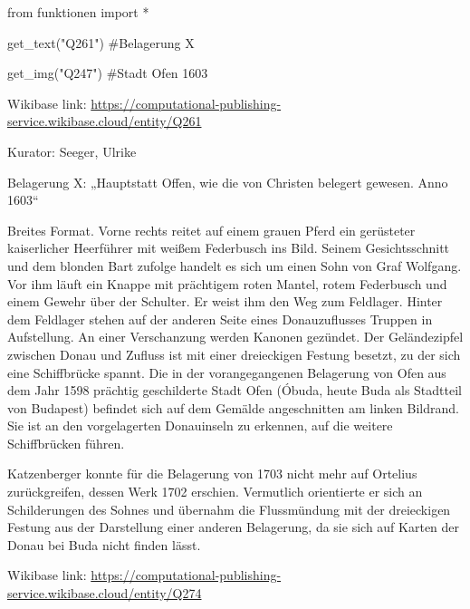 \documentclass[
  a4paper,
  portrait]{book}
\newenvironment{Shaded}{\begin{snugshade}}{\end{snugshade}}
\newcommand{\CommentTok}[1]{\textcolor[rgb]{0.37,0.37,0.37}{#1}}
\newcommand{\ImportTok}[1]{\textcolor[rgb]{0.00,0.46,0.62}{#1}}
\newcommand{\NormalTok}[1]{\textcolor[rgb]{0.00,0.23,0.31}{#1}}
\newcommand{\OperatorTok}[1]{\textcolor[rgb]{0.37,0.37,0.37}{#1}}
\newcommand{\StringTok}[1]{\textcolor[rgb]{0.13,0.47,0.30}{#1}}
\begin{document}
\begin{Shaded}
\begin{Highlighting}[]
\ImportTok{from}\NormalTok{ funktionen }\ImportTok{import} \OperatorTok{*}
\end{Highlighting}
\end{Shaded}

\begin{Shaded}
\begin{Highlighting}[]
\NormalTok{get\_text(}\StringTok{"Q261"}\NormalTok{)}
\CommentTok{\#Belagerung X}

\NormalTok{get\_img(}\StringTok{"Q247"}\NormalTok{)}
\CommentTok{\#Stadt Ofen 1603}
\end{Highlighting}
\end{Shaded}

Wikibase link:
\url{https://computational-publishing-service.wikibase.cloud/entity/Q261}

Kurator: Seeger, Ulrike

Belagerung X: „Hauptstatt Offen, wie die von Christen belegert gewesen.
Anno 1603``

Breites Format. Vorne rechts reitet auf einem grauen Pferd ein
gerüsteter kaiserlicher Heerführer mit weißem Federbusch ins Bild.
Seinem Gesichtsschnitt und dem blonden Bart zufolge handelt es sich um
einen Sohn von Graf Wolfgang. Vor ihm läuft ein Knappe mit prächtigem
roten Mantel, rotem Federbusch und einem Gewehr über der Schulter. Er
weist ihm den Weg zum Feldlager. Hinter dem Feldlager stehen auf der
anderen Seite eines Donauzuflusses Truppen in Aufstellung. An einer
Verschanzung werden Kanonen gezündet. Der Geländezipfel zwischen Donau
und Zufluss ist mit einer dreieckigen Festung besetzt, zu der sich eine
Schiffbrücke spannt. Die in der vorangegangenen Belagerung von Ofen aus
dem Jahr 1598 prächtig geschilderte Stadt Ofen (Óbuda, heute Buda als
Stadtteil von Budapest) befindet sich auf dem Gemälde angeschnitten am
linken Bildrand. Sie ist an den vorgelagerten Donauinseln zu erkennen,
auf die weitere Schiffbrücken führen.

Katzenberger konnte für die Belagerung von 1703 nicht mehr auf Ortelius
zurückgreifen, dessen Werk 1702 erschien. Vermutlich orientierte er sich
an Schilderungen des Sohnes und übernahm die Flussmündung mit der
dreieckigen Festung aus der Darstellung einer anderen Belagerung, da sie
sich auf Karten der Donau bei Buda nicht finden lässt.

Wikibase link:
\url{https://computational-publishing-service.wikibase.cloud/entity/Q274}
\end{document}
